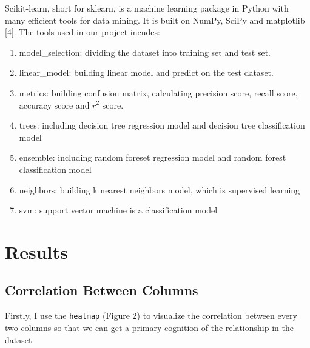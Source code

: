 \documentclass[12pt]{article}
\begin{document}
\begin{sloppypar}
Scikit-learn, short for sklearn, is a machine learning package in Python with many efficient tools for data mining. It is built on NumPy, SciPy and matplotlib [4]. The tools used in our project incudes: 
\begin{enumerate}
    \item model\_selection: dividing the dataset into training set and test set.
    \item linear\_model: building linear model and predict on the test dataset.
    \item metrics: building confusion matrix, calculating precision score, recall score, accuracy score and $r^2$ score. 
    \item trees: including decision tree regression model and decision tree classification model
    \item ensemble: including random foreset regression model and random forest classification model
    \item neighbors: building k nearest neighbors model, which is supervised learning
    \item svm: support vector machine is a classification model
\end{enumerate}

\section{Results}

\subsection{Correlation Between Columns}

Firstly, I use the \texttt{heatmap} (Figure 2) to visualize the correlation between every two columns so that we can get a primary cognition of the relationship in the dataset.


\end{sloppypar}
\end{document}
